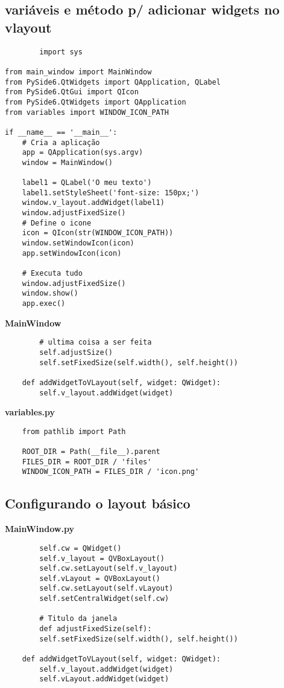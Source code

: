 \documentclass[12pt,a4paper]{article}
\begin{document}
    \subsection{variáveis e método p/ adicionar widgets no vlayout}
    \begin{lstlisting}
        import sys

from main_window import MainWindow
from PySide6.QtWidgets import QApplication, QLabel
from PySide6.QtGui import QIcon
from PySide6.QtWidgets import QApplication
from variables import WINDOW_ICON_PATH

if __name__ == '__main__':
    # Cria a aplicação
    app = QApplication(sys.argv)
    window = MainWindow()

    label1 = QLabel('O meu texto')
    label1.setStyleSheet('font-size: 150px;')
    window.v_layout.addWidget(label1)
    window.adjustFixedSize()
    # Define o icone
    icon = QIcon(str(WINDOW_ICON_PATH))
    window.setWindowIcon(icon)
    app.setWindowIcon(icon)

    # Executa tudo
    window.adjustFixedSize()
    window.show()
    app.exec()
    \end{lstlisting}
    \textbf{MainWindow}
    \begin{lstlisting}
        # ultima coisa a ser feita
        self.adjustSize()
        self.setFixedSize(self.width(), self.height())

    def addWidgetToVLayout(self, widget: QWidget):
        self.v_layout.addWidget(widget)
    \end{lstlisting}
    \textbf{variables.py}
    \begin{lstlisting}
    from pathlib import Path

    ROOT_DIR = Path(__file__).parent
    FILES_DIR = ROOT_DIR / 'files'
    WINDOW_ICON_PATH = FILES_DIR / 'icon.png'
    \end{lstlisting}

    \subsection{Configurando o layout básico}
    \textbf{MainWindow.py}
    \begin{lstlisting}
        self.cw = QWidget()
        self.v_layout = QVBoxLayout()
        self.cw.setLayout(self.v_layout)
        self.vLayout = QVBoxLayout()
        self.cw.setLayout(self.vLayout)
        self.setCentralWidget(self.cw)

        # Titulo da janela
        def adjustFixedSize(self):
        self.setFixedSize(self.width(), self.height())

    def addWidgetToVLayout(self, widget: QWidget):
        self.v_layout.addWidget(widget)
        self.vLayout.addWidget(widget)
    \end{lstlisting}
\end{document}
